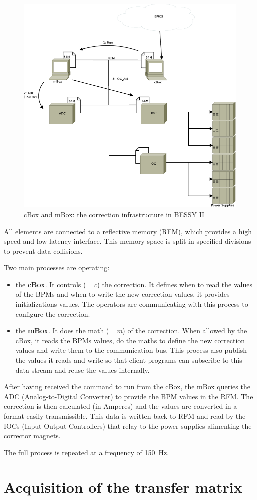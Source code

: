 \begin{figure}[!h]
    \centering
    \includegraphics[width=.85\linewidth]{img/mBox_cBox}
    \caption{\label{fig:cbox_mbox}cBox and mBox: the correction infrastructure in BESSY II}
\end{figure}

All elements are connected to a reflective memory (RFM), which provides a high speed and low latency interface. This memory space is split in specified divisions to prevent data collisions.

Two main processes are operating:
\begin{itemize}
    \item the \textbf{cBox}. It controls (= \textit{c}) the correction. It defines when to read the values of the BPMs and when to write the new correction values, it provides initializations values. The operators are communicating with this process to configure the correction.
    \item the \textbf{mBox}. It does the math (= \textit{m}) of the correction. When allowed by the cBox, it reads the BPMs values, do the maths to define the new correction values and write them to the communication bus. This process also publish the values it reads and write so that client programs can subscribe to this data stream and reuse the values internally.
\end{itemize}

After having received the command to run from the cBox, the mBox queries the ADC (Analog-to-Digital Converter) to provide the BPM values in the RFM. The correction is then calculated (in Amperes) and the values are converted in a format easily transmissible. This data is written back to RFM and read by the IOCs (Input-Output Controllers) that relay to the power supplies alimenting the corrector magnets.

The full process is repeated at a frequency of 150~Hz. 

\section{Acquisition of the transfer matrix}
